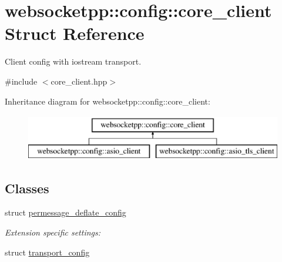 \hypertarget{structwebsocketpp_1_1config_1_1core__client}{}\section{websocketpp\+:\+:config\+:\+:core\+\_\+client Struct Reference}
\label{structwebsocketpp_1_1config_1_1core__client}


Client config with iostream transport.  




{\ttfamily \#include $<$core\+\_\+client.\+hpp$>$}

Inheritance diagram for websocketpp\+:\+:config\+:\+:core\+\_\+client\+:\begin{figure}[H]
\begin{center}
\leavevmode
\includegraphics[height=2.000000cm]{structwebsocketpp_1_1config_1_1core__client}
\end{center}
\end{figure}
\subsection*{Classes}
\begin{DoxyCompactItemize}
\item 
struct \hyperlink{structwebsocketpp_1_1config_1_1core__client_1_1permessage__deflate__config}{permessage\+\_\+deflate\+\_\+config}
\begin{DoxyCompactList}\small\item\em Extension specific settings\+: \end{DoxyCompactList}\item 
struct \hyperlink{structwebsocketpp_1_1config_1_1core__client_1_1transport__config}{transport\+\_\+config}
\end{DoxyCompactItemize}
